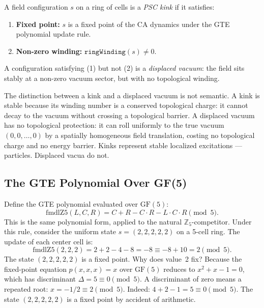 \documentclass[11pt,openany]{book}
\theoremstyle{remark}
\begin{document}
\begin{tcolorbox}[colback=green!5,colframe=green!50!black,
  title={Definition: Topological Kink (PSC Kink Predicate)}]
A field configuration $s$ on a ring of cells is a \emph{PSC kink} if it satisfies:
\begin{enumerate}[label=(\arabic*),itemsep=2pt]
\item \textbf{Fixed point:} $s$ is a fixed point of the CA dynamics under the GTE
  polynomial update rule.
\item \textbf{Non-zero winding:} $\mathtt{ringWinding}(s) \neq 0$.
\end{enumerate}
A configuration satisfying (1) but not (2) is a \emph{displaced vacuum}: the field
sits stably at a non-zero vacuum sector, but with no topological winding.
\end{tcolorbox}

The distinction between a kink and a displaced vacuum is not semantic. A kink is
stable because its winding number is a conserved topological charge: it cannot decay
to the vacuum without crossing a topological barrier. A displaced vacuum has no
topological protection: it can roll uniformly to the true vacuum $(0,0,\ldots,0)$ by
a spatially homogeneous field translation, costing no topological charge and no energy
barrier. Kinks represent stable localized excitations --- particles. Displaced vacua do not.

\subsection*{The GTE Polynomial Over GF(5)}

Define the GTE polynomial evaluated over $\mathrm{GF}(5)$:
\begin{equation}
  \mathrm{fmdlZ5}(L,C,R) = C + R - C \cdot R - L \cdot C \cdot R \pmod{5}.
\end{equation}
This is the same polynomial form, applied to the natural $\mathbb{Z}_5$-competitor.
Under this rule, consider the uniform state $s = (2,2,2,2,2)$ on a 5-cell ring.
The update of each center cell is:
\[
\mathrm{fmdlZ5}(2,2,2) = 2+2-4-8 = -8 \equiv -8 + 10 = 2 \pmod 5.
\]
The state $(2,2,2,2,2)$ is a fixed point. Why does value~2 fix? Because the
fixed-point equation $p(x,x,x) = x$ over $\mathrm{GF}(5)$ reduces to $x^2+x-1=0$,
which has discriminant $\Delta = 5 \equiv 0 \pmod 5$. A discriminant of zero means
a repeated root: $x = -1/2 \equiv 2 \pmod 5$. Indeed: $4+2-1 = 5 \equiv 0 \pmod 5$.
The state $(2,2,2,2,2)$ is a fixed point by accident of arithmetic.
\end{document}
